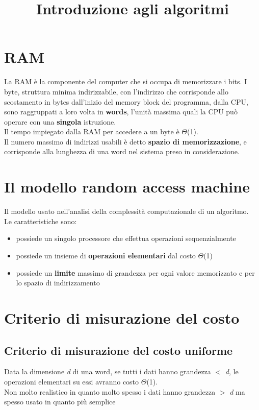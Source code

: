 \documentclass{report}
\title{
    Introduzione agli algoritmi \\
}
\newcommand{\T}[1]{$\Theta$(#1)}
\begin{document}
\maketitle
\tableofcontents

\newpage
{}
\section{RAM}
    La RAM è la componente del computer che si occupa di memorizzare i bits.
    I byte, struttura minima indirizzabile, con l'indirizzo che corrisponde
    allo scostamento in bytes dall'inizio del memory block del programma, dalla CPU, 
    sono raggruppati a loro volta in \textbf{words}, l'unità massima quali la 
    CPU può operare con una \textbf{singola} istruzione. \\
    Il tempo impiegato dalla RAM per accedere a un byte è \T{1}. \\
    Il numero massimo di indirizzi usabili è detto \textbf{spazio di memorizzazione}, 
    e corrisponde alla lunghezza di una word nel sistema preso in considerazione.
\section{Il modello random access machine}
    Il modello usato nell'analisi della complessità computazionale di un algoritmo. \\
    Le caratteristiche sono:
    \begin{itemize}
        \item possiede un singolo processore che effettua operazioni sequenzialmente
        \item possiede un insieme di \textbf{operazioni elementari} dal costo \T{1}
        \item possiede un \textbf{limite} massimo di grandezza per ogni valore memorizzato
            e per lo spazio di indirizzamento
    \end{itemize}
\section{Criterio di misurazione del costo}
    \subsection{Criterio di misurazione del costo uniforme}
        Data la dimensione \textit{d} di una word, se tutti i dati hanno grandezza $ < $ \textit{d}, 
        le operazioni elementari su essi avranno costo \T{1}. \\
        Non molto realistico in quanto molto spesso i dati hanno grandezza $ > $ \textit{d}
        ma spesso usato in quanto più semplice
\end{document}
